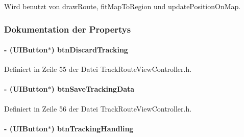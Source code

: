 Wird benutzt von drawRoute, fitMapToRegion und updatePositionOnMap.

\subsubsection{Dokumentation der Propertys}
\hypertarget{interface_track_route_view_controller_a2ea7a7f545535b9e94105d0706ce23b4}{
\paragraph[{btnDiscardTracking}]{\setlength{\rightskip}{0pt plus 5cm}-\/ (UIButton$\ast$) {\bf btnDiscardTracking}}\hfill}
\label{interface_track_route_view_controller_a2ea7a7f545535b9e94105d0706ce23b4}


Definiert in Zeile 55 der Datei TrackRouteViewController.h.\hypertarget{interface_track_route_view_controller_a54cf7a93068f9ae133a033aa8eb35449}{
\paragraph[{btnSaveTrackingData}]{\setlength{\rightskip}{0pt plus 5cm}-\/ (UIButton$\ast$) {\bf btnSaveTrackingData}}\hfill}
\label{interface_track_route_view_controller_a54cf7a93068f9ae133a033aa8eb35449}


Definiert in Zeile 56 der Datei TrackRouteViewController.h.\hypertarget{interface_track_route_view_controller_a6b43bd4f8e42c4aa6cb090dc5ef14479}{
\paragraph[{btnTrackingHandling}]{\setlength{\rightskip}{0pt plus 5cm}-\/ (UIButton$\ast$) {\bf btnTrackingHandling}}\hfill}
\label{interface_track_route_view_controller_a6b43bd4f8e42c4aa6cb090dc5ef14479}


